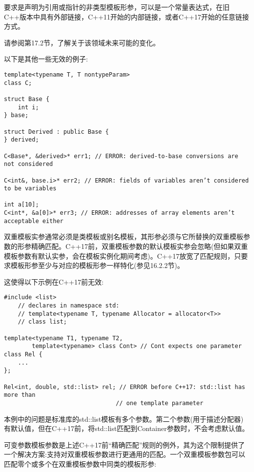 要求是声明为引用或指针的非类型模板形参，可以是一个常量表达式，在旧C++版本中具有外部链接，C++11开始的内部链接，或者C++17开始的任意链接方式。

请参阅第17.2节，了解关于该领域未来可能的变化。

以下是其他一些无效的例子:

\begin{lstlisting}[style=styleCXX]
template<typename T, T nontypeParam>
class C;

struct Base {
	int i;
} base;

struct Derived : public Base {
} derived;

C<Base*, &derived>* err1; // ERROR: derived-to-base conversions are not considered

C<int&, base.i>* err2; // ERROR: fields of variables aren’t considered to be variables

int a[10];
C<int*, &a[0]>* err3; // ERROR: addresses of array elements aren’t acceptable either
\end{lstlisting}



双重模板实参通常必须是类模板或别名模板，其形参必须与它所替换的双重模板参数的形参精确匹配。C++17前，双重模板参数的默认模板实参会忽略(但如果双重模板参数有默认实参，会在模板实例化期间考虑)。C++17放宽了匹配规则，只要求模板形参至少与对应的模板形参一样特化(参见16.2.2节)。

这使得以下示例在C++17前无效:

\begin{lstlisting}[style=styleCXX]
#include <list>
	// declares in namespace std:
	// template<typename T, typename Allocator = allocator<T>>
	// class list;

template<typename T1, typename T2,
		template<typename> class Cont> // Cont expects one parameter
class Rel {
	...
};

Rel<int, double, std::list> rel; // ERROR before C++17: std::list has more than
								// one template parameter
\end{lstlisting}

本例中的问题是标准库的std::list模板有多个参数。第二个参数(用于描述分配器)有默认值，但在C++17前，将std::list匹配到Container参数时，不会考虑默认值。

可变参数模板参数是上述C++17前“精确匹配”规则的例外，其为这个限制提供了一个解决方案:支持对双重模板参数进行更通用的匹配。一个双重模板参数包可以匹配零个或多个在双重模板参数中同类的模板形参:

